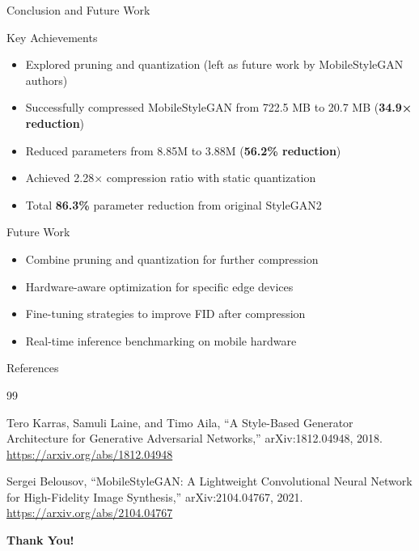 \documentclass[aspectratio=169,xcolor=dvipsnames]{beamer}
\begin{document}
\begin{frame}{Conclusion and Future Work}
    \begin{block}{Key Achievements}
        \begin{itemize}
            \item Explored pruning and quantization (left as future work by MobileStyleGAN authors)
            \item Successfully compressed MobileStyleGAN from 722.5 MB to 20.7 MB (\textbf{34.9× reduction})
            \item Reduced parameters from 8.85M to 3.88M (\textbf{56.2\% reduction})
            \item Achieved 2.28× compression ratio with static quantization
            \item Total \textbf{86.3\%} parameter reduction from original StyleGAN2
        \end{itemize}
    \end{block}
    
    \begin{block}{Future Work}
        \begin{itemize}
            \item Combine pruning and quantization for further compression
            \item Hardware-aware optimization for specific edge devices
            \item Fine-tuning strategies to improve FID after compression
            \item Real-time inference benchmarking on mobile hardware
        \end{itemize}
    \end{block}
\end{frame}

\begin{frame}{References}
    \footnotesize
    \begin{thebibliography}{99}

    Tero Karras, Samuli Laine, and Timo Aila, “A Style-Based Generator Architecture for Generative Adversarial Networks,” arXiv:1812.04948, 2018. \\
    \url{https://arxiv.org/abs/1812.04948}

    \vspace{0.3em}

    Sergei Belousov, “MobileStyleGAN: A Lightweight Convolutional Neural Network for High-Fidelity Image Synthesis,” arXiv:2104.04767, 2021. \\
    \url{https://arxiv.org/abs/2104.04767}

    \end{thebibliography}
\end{frame}



\begin{frame}
    \Huge{\centerline{\textbf{Thank You!}}}
\end{frame}

\end{document}
